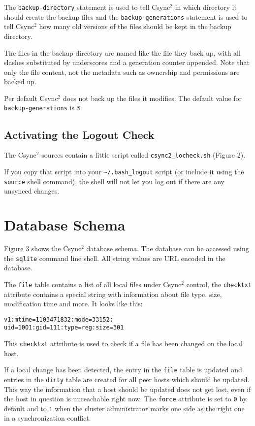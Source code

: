 \documentclass[a4paper,twocolumn]{article}
\def\csync2{{\sc Csync$^{2}$}}
\begin{document}
The {\tt backup-directory} statement is used to tell \csync2 in which directory
it should create the backup files and the {\tt backup-generations} statement is
used to tell \csync2 how many old versions of the files should be kept in the
backup directory.

The files in the backup directory are named like the file they back up, with
all slashes substituted by underscores and a generation counter appended. Note
that only the file content, not the metadata such as ownership and permissions
are backed up.

Per default \csync2 does not back up the files it modifies. The default
value for {\tt backup-generations} is {\tt 3}.

\subsection{Activating the Logout Check}

The \csync2 sources contain a little script called {\tt csync2\_locheck.sh} 
(Figure 2).

If you copy that script into your {\tt \textasciitilde/.bash\_logout} script
(or include it using the {\tt source} shell command), the shell will not let
you log out if there are any unsynced changes.

\section{Database Schema}

Figure 3 shows the \csync2 database schema. The database can be accessed using
the {\tt sqlite} command line shell. All string values are URL encoded in the
database.

The {\tt file} table contains a list of all local files under \csync2 control,
the {\tt checktxt} attribute contains a special string with information about
file type, size, modification time and more. It looks like this:

\begin{verbatim}
v1:mtime=1103471832:mode=33152:
uid=1001:gid=111:type=reg:size=301
\end{verbatim}

This {\tt checktxt} attribute is used to check if a file has been changed on
the local host.

If a local change has been detected, the entry in the {\tt file} table is
updated and entries in the {\tt dirty} table are created for all peer hosts
which should be updated. This way the information that a host should be updated
does not get lost, even if the host in question is unreachable right now. The
{\tt force} attribute is set to {\tt 0} by default and to {\tt 1} when the
cluster administrator marks one side as the right one in a synchronization
conflict.
\end{document}
